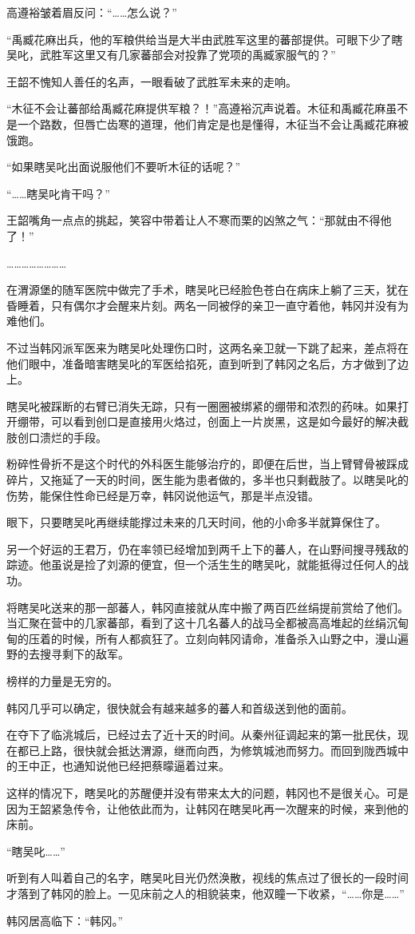 高遵裕皱着眉反问：“……怎么说？”

“禹臧花麻出兵，他的军粮供给当是大半由武胜军这里的蕃部提供。可眼下少了瞎吴叱，武胜军这里又有几家蕃部会对投靠了党项的禹臧家服气的？”

王韶不愧知人善任的名声，一眼看破了武胜军未来的走响。

“木征不会让蕃部给禹臧花麻提供军粮？！”高遵裕沉声说着。木征和禹臧花麻虽不是一个路数，但唇亡齿寒的道理，他们肯定是也是懂得，木征当不会让禹臧花麻被饿跑。

“如果瞎吴叱出面说服他们不要听木征的话呢？”

“……瞎吴叱肯干吗？”

王韶嘴角一点点的挑起，笑容中带着让人不寒而栗的凶煞之气：“那就由不得他了！”

……………………

在渭源堡的随军医院中做完了手术，瞎吴叱已经脸色苍白在病床上躺了三天，犹在昏睡着，只有偶尔才会醒来片刻。两名一同被俘的亲卫一直守着他，韩冈并没有为难他们。

不过当韩冈派军医来为瞎吴叱处理伤口时，这两名亲卫就一下跳了起来，差点将在他们眼中，准备暗害瞎吴叱的军医给掐死，直到听到了韩冈之名后，方才做到了边上。

瞎吴叱被踩断的右臂已消失无踪，只有一圈圈被绑紧的绷带和浓烈的药味。如果打开绷带，可以看到创口是直接用火烙过，创面上一片炭黑，这是如今最好的解决截肢创口溃烂的手段。

粉碎性骨折不是这个时代的外科医生能够治疗的，即便在后世，当上臂臂骨被踩成碎片，又拖延了一天的时间，医生能为患者做的，多半也只剩截肢了。以瞎吴叱的伤势，能保住性命已经是万幸，韩冈说他运气，那是半点没错。

眼下，只要瞎吴叱再继续能撑过未来的几天时间，他的小命多半就算保住了。

另一个好运的王君万，仍在率领已经增加到两千上下的蕃人，在山野间搜寻残敌的踪迹。他虽说是捡了刘源的便宜，但一个活生生的瞎吴叱，就能抵得过任何人的战功。

将瞎吴叱送来的那一部蕃人，韩冈直接就从库中搬了两百匹丝绢提前赏给了他们。当汇聚在营中的几家蕃部，看到了这十几名蕃人的战马全都被高高堆起的丝绢沉甸甸的压着的时候，所有人都疯狂了。立刻向韩冈请命，准备杀入山野之中，漫山遍野的去搜寻剩下的敌军。

榜样的力量是无穷的。

韩冈几乎可以确定，很快就会有越来越多的蕃人和首级送到他的面前。

在夺下了临洮城后，已经过去了近十天的时间。从秦州征调起来的第一批民伕，现在都已上路，很快就会抵达渭源，继而向西，为修筑城池而努力。而回到陇西城中的王中正，也通知说他已经把蔡曚逼着过来。

这样的情况下，瞎吴叱的苏醒便并没有带来太大的问题，韩冈也不是很关心。可是因为王韶紧急传令，让他依此而为，让韩冈在瞎吴叱再一次醒来的时候，来到他的床前。

“瞎吴叱……”

听到有人叫着自己的名字，瞎吴叱目光仍然涣散，视线的焦点过了很长的一段时间才落到了韩冈的脸上。一见床前之人的相貌装束，他双瞳一下收紧，“……你是……”

韩冈居高临下：“韩冈。”

